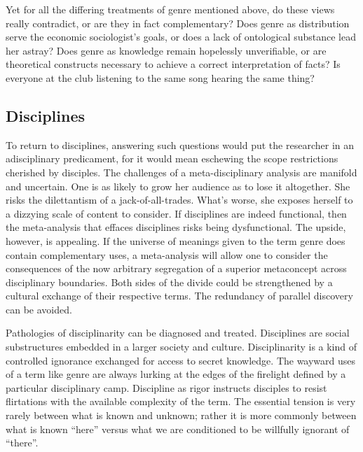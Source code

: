 \documentclass[]{book}
\theoremstyle{definition}
\theoremstyle{definition}
\theoremstyle{definition}
\theoremstyle{remark}
\begin{document}
Yet for all the differing treatments of genre mentioned above, do these
views really contradict, or are they in fact complementary? Does genre
as distribution serve the economic sociologist's goals, or does a lack
of ontological substance lead her astray? Does genre as knowledge remain
hopelessly unverifiable, or are theoretical constructs necessary to
achieve a correct interpretation of facts? Is everyone at the club
listening to the same song hearing the same thing?

\hypertarget{disciplines}{%
\subsection{Disciplines}\label{disciplines}}

To return to disciplines, answering such questions would put the
researcher in an adisciplinary predicament, for it would mean eschewing
the scope restrictions cherished by disciples. The challenges of a
meta-disciplinary analysis are manifold and uncertain. One is as likely
to grow her audience as to lose it altogether. She risks the
dilettantism of a jack-of-all-trades. What's worse, she exposes herself
to a dizzying scale of content to consider. If disciplines are indeed
functional, then the meta-analysis that effaces disciplines risks being
dysfunctional. The upside, however, is appealing. If the universe of
meanings given to the term genre does contain complementary uses, a
meta-analysis will allow one to consider the consequences of the now
arbitrary segregation of a superior metaconcept across disciplinary
boundaries. Both sides of the divide could be strengthened by a cultural
exchange of their respective terms. The redundancy of parallel discovery
can be avoided.

Pathologies of disciplinarity can be diagnosed and treated. Disciplines
are social substructures embedded in a larger society and culture.
Disciplinarity is a kind of controlled ignorance exchanged for access to
secret knowledge. The wayward uses of a term like genre are always
lurking at the edges of the firelight defined by a particular
disciplinary camp. Discipline as rigor instructs disciples to resist
flirtations with the available complexity of the term. The essential
tension is very rarely between what is known and unknown; rather it is
more commonly between what is known ``here'' versus what we are
conditioned to be willfully ignorant of ``there''.
\end{document}
